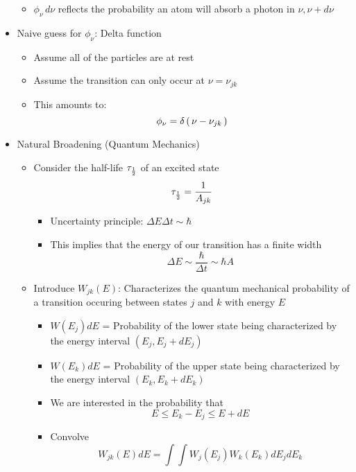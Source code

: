 \documentclass[12pt,letterpaper]{article}
\begin{document}
\begin{Aenumerate}
\begin{itemize}
\begin{itemize}
	\item $\phi_\nu \, d\nu$ reflects the probability an atom will absorb
         a photon in $\nu, \nu + d\nu$
	\end{itemize}
 \item Naive guess for $\phi_\nu$:  Delta function
	\begin{itemize}
	\item Assume all of the particles are at rest
	\item Assume the transition can only occur at $\nu = \nu_{jk}$
	\item This amounts to:
	\begin{equation}
	\phi_\nu = \delta \left ( \, \nu - \nu_{jk} \, \right )
	\end{equation}
	\end{itemize}

\item Natural Broadening (Quantum Mechanics)
	\begin{itemize}
	\item Consider the half-life $\tau_{\frac{1}{2}}$ of an excited state
	\begin{equation}
	\tau_{\frac{1}{2}} = \frac{1}{A_{jk}}
	\end{equation}
		\begin{itemize}
		\item Uncertainty principle: $\Delta E \Delta t \sim \hbar$
		\item This implies that the energy of our transition 
		has a finite width
		\begin{equation}
		\Delta E \sim \frac{\hbar}{\Delta t} \sim \hbar A
		\end{equation}
		\end{itemize}
	\item Introduce $W_{jk}(E)$: Characterizes the quantum mechanical
	probability of a transition occuring between states $j$ and $k$ with
	energy $E$
		\begin{itemize}
		\item $W(E_j)dE$ = Probability of the lower state being characterized
		by the energy interval $(E_j, E_j+dE_j)$
		\item $W(E_k)dE$ = Probability of the upper state being characterized
		by the energy interval $(E_k, E_k+dE_k)$
		\item We are interested in the probability that 
		\begin{equation}
		E \le E_k - E_j \le E+dE
		\end{equation}
		\item Convolve
		\begin{equation}
		W_{jk}(E)dE = \int\int W_j(E_j) W_k(E_k) dE_j dE_k
		\end{equation}


\end{itemize}
\end{itemize}
\end{itemize}
\end{Aenumerate}
\end{document}
